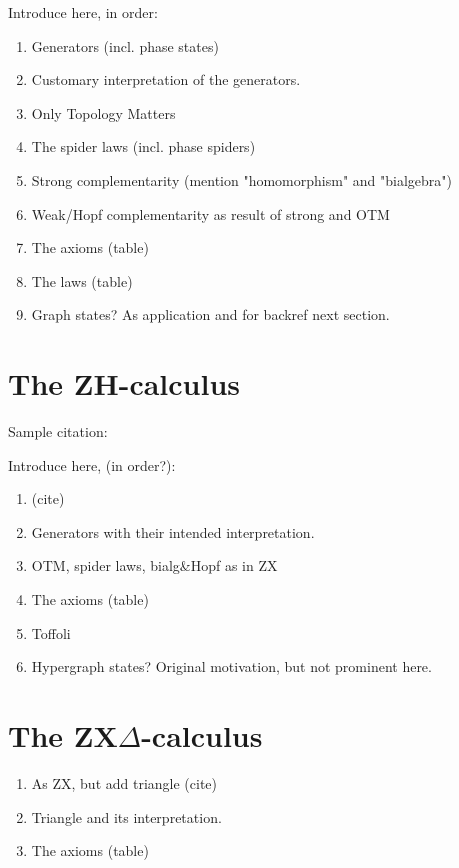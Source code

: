 \begin{TODOLIST}
Introduce here, in order:
\begin{enumerate}
\item Generators (incl. phase states)
\item Customary interpretation of the generators.
\item Only Topology Matters
\item The spider laws (incl. phase spiders)
\item Strong complementarity (mention "homomorphism" and "bialgebra")
\item Weak/Hopf complementarity as result of strong and OTM
\item The axioms (table)
\item The laws (table)
\item Graph states? As application and for backref next section.
\end{enumerate}
\end{TODOLIST}

\section{The ZH-calculus}\label{sec:zh-background}

Sample citation: \cite{backens2018zhcalculus}
\begin{TODOLIST}
Introduce here, (in order?):
\begin{enumerate}
\item (cite)
\item Generators with their intended interpretation.
\item OTM, spider laws, bialg\&Hopf as in ZX
\item The axioms (table)
\item Toffoli
\item Hypergraph states? Original motivation, but not prominent here.
\end{enumerate} 
\end{TODOLIST}

\section{The ZX$\Delta$-calculus}\label{sec:zxd-background}

\begin{TODOLIST}
\begin{enumerate}
\item As ZX, but add triangle (cite)
\item Triangle and its interpretation.
\item The axioms (table)
\end{enumerate}
\end{TODOLIST}

